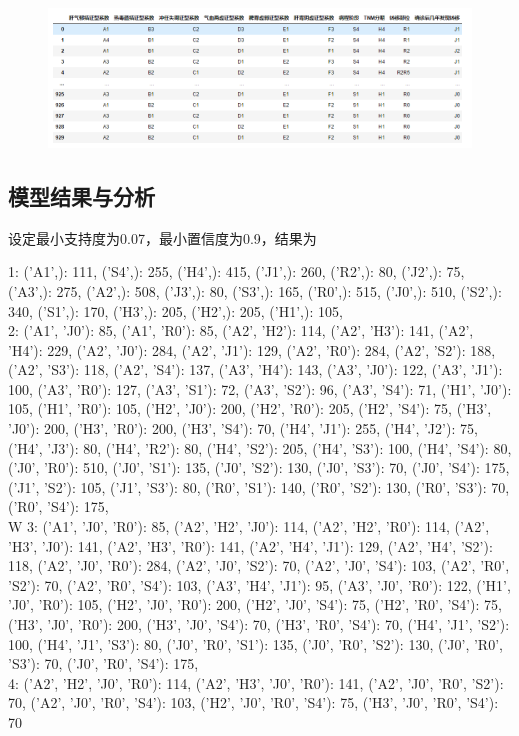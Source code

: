 \documentclass[withoutpreface,bwprint]{cumcmthesis} %
\begin{document}
\begin{figure}[H]
	\centering
	\includegraphics[width=\linewidth]{figures/731}
	\caption{}
	\label{fig:731}
\end{figure}

\par 

\subsection{模型结果与分析}
\par 设定最小支持度为0.07，最小置信度为0.9，结果为

{1: {('A1',): 111, ('S4',): 255, ('H4',): 415, ('J1',): 260, ('R2',): 80, ('J2',): 75, ('A3',): 275, ('A2',): 508, ('J3',): 80, ('S3',): 165, ('R0',): 515, ('J0',): 510, ('S2',): 340, ('S1',): 170, ('H3',): 205, ('H2',): 205, ('H1',): 105},\\
	
	 2: {('A1', 'J0'): 85, ('A1', 'R0'): 85, ('A2', 'H2'): 114, ('A2', 'H3'): 141, ('A2', 'H4'): 229, ('A2', 'J0'): 284, ('A2', 'J1'): 129, ('A2', 'R0'): 284, ('A2', 'S2'): 188, ('A2', 'S3'): 118, ('A2', 'S4'): 137, ('A3', 'H4'): 143, ('A3', 'J0'): 122, ('A3', 'J1'): 100, ('A3', 'R0'): 127, ('A3', 'S1'): 72, ('A3', 'S2'): 96, ('A3', 'S4'): 71, ('H1', 'J0'): 105, ('H1', 'R0'): 105, ('H2', 'J0'): 200, ('H2', 'R0'): 205, ('H2', 'S4'): 75, ('H3', 'J0'): 200, ('H3', 'R0'): 200, ('H3', 'S4'): 70, ('H4', 'J1'): 255, ('H4', 'J2'): 75, ('H4', 'J3'): 80, ('H4', 'R2'): 80, ('H4', 'S2'): 205, ('H4', 'S3'): 100, ('H4', 'S4'): 80, ('J0', 'R0'): 510, ('J0', 'S1'): 135, ('J0', 'S2'): 130, ('J0', 'S3'): 70, ('J0', 'S4'): 175, ('J1', 'S2'): 105, ('J1', 'S3'): 80, ('R0', 'S1'): 140, ('R0', 'S2'): 130, ('R0', 'S3'): 70, ('R0', 'S4'): 175}, \\
	 W
	3: {('A1', 'J0', 'R0'): 85, ('A2', 'H2', 'J0'): 114, ('A2', 'H2', 'R0'): 114, ('A2', 'H3', 'J0'): 141, ('A2', 'H3', 'R0'): 141, ('A2', 'H4', 'J1'): 129, ('A2', 'H4', 'S2'): 118, ('A2', 'J0', 'R0'): 284, ('A2', 'J0', 'S2'): 70, ('A2', 'J0', 'S4'): 103, ('A2', 'R0', 'S2'): 70, ('A2', 'R0', 'S4'): 103, ('A3', 'H4', 'J1'): 95, ('A3', 'J0', 'R0'): 122, ('H1', 'J0', 'R0'): 105, ('H2', 'J0', 'R0'): 200, ('H2', 'J0', 'S4'): 75, ('H2', 'R0', 'S4'): 75, ('H3', 'J0', 'R0'): 200, ('H3', 'J0', 'S4'): 70, ('H3', 'R0', 'S4'): 70, ('H4', 'J1', 'S2'): 100, ('H4', 'J1', 'S3'): 80, ('J0', 'R0', 'S1'): 135, ('J0', 'R0', 'S2'): 130, ('J0', 'R0', 'S3'): 70, ('J0', 'R0', 'S4'): 175}, \\
	
	4: {('A2', 'H2', 'J0', 'R0'): 114, ('A2', 'H3', 'J0', 'R0'): 141, ('A2', 'J0', 'R0', 'S2'): 70, ('A2', 'J0', 'R0', 'S4'): 103, ('H2', 'J0', 'R0', 'S4'): 75, ('H3', 'J0', 'R0', 'S4'): 70}}
\end{document}
